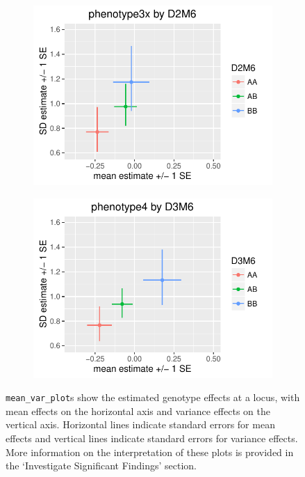\documentclass{article}
\begin{document}
\begin{figure}[htbp]
    \begin{subfigure}[t]{0.5\textwidth}
        \includegraphics[width=\textwidth]{images/mean_var_plot_phen3x.pdf}
    \end{subfigure}
    \hfill
    \begin{subfigure}[t]{0.5\textwidth}
        \includegraphics[width=\textwidth]{images/mean_var_plot_phen4x.pdf}
    \end{subfigure}

    \caption{\texttt{mean\_var\_plot}s show the estimated genotype effects at a locus, with mean effects on the horizontal axis and variance effects on the vertical axis.  Horizontal lines indicate standard errors for mean effects and vertical lines indicate standard errors for variance effects.  More information on the interpretation of these plots is provided in the `Investigate Significant Findings' section. \label{fig:apdx_mean_var_plots}}
\end{figure}
\end{document}
